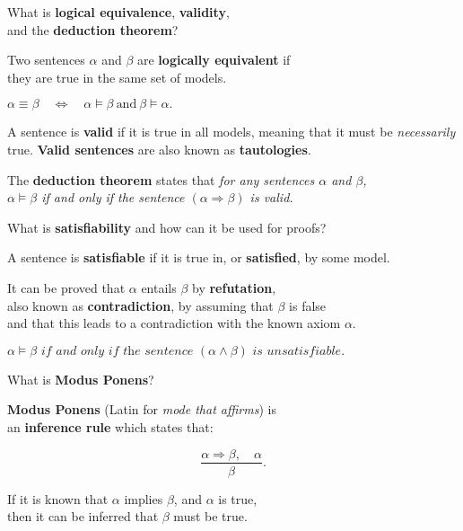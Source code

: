 \begin{flashcard}[Question]{What is \textbf{logical equivalence}, \textbf{validity},\\and the \textbf{deduction theorem}?}
\begin{center}
Two sentences $\alpha$ and $\beta$ are \textbf{logically equivalent} if\\they are true in the same set of models.

\medskip

$\alpha \equiv \beta \quad \Leftrightarrow \quad \alpha \models \beta ~ \text{and} ~ \beta \models \alpha .$

\medskip

A sentence is \textbf{valid} if it is true in all models, meaning that it must be \textit{necessarily} true. \textbf{Valid sentences} are also known as \textbf{tautologies}.

\medskip

The \textbf{deduction theorem} states that \textit{for any sentences $\alpha$ and $\beta$,\\$\alpha \models \beta$ if and only if the sentence $(\alpha \Rightarrow \beta)$ is valid.}
\end{center}
\end{flashcard}

\begin{flashcard}[Question]{What is \textbf{satisfiability} and how can it be used for proofs?}
\begin{center}
A sentence is \textbf{satisfiable} if it is true in, or \textbf{satisfied}, by some model.

\medskip

It can be proved that $\alpha$ entails $\beta$ by \textbf{refutation},\\also known as \textbf{contradiction}, by assuming that $\beta$ is false\\and that this leads to a contradiction with the known axiom $\alpha$.

\medskip

$\alpha \models \beta \textit{~if and only if the sentence~} (\alpha \land \beta) \textit{~is unsatisfiable.}$
\end{center}
\end{flashcard}


\begin{flashcard}[Question]{What is \textbf{Modus Ponens}?}
\begin{center}
\textbf{Modus Ponens} (Latin for \textit{mode that affirms}) is\\an \textbf{inference rule} which states that:

\begin{displaymath}
\frac{\alpha \Rightarrow \beta, \quad \alpha}{\beta}.
\end{displaymath}

If it is known that $\alpha$ implies $\beta$, and $\alpha$ is true,\\then it can be inferred that $\beta$ must be true.
\end{center}
\end{flashcard}

